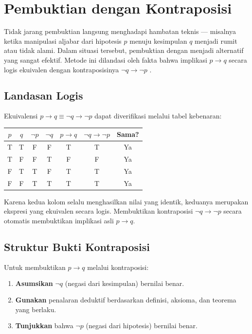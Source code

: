 \section{Pembuktian dengan Kontraposisi}

Tidak jarang pembuktian langsung menghadapi hambatan teknis --- misalnya ketika manipulasi aljabar dari hipotesis $p$ menuju kesimpulan $q$ menjadi rumit atau tidak alami. Dalam situasi tersebut, pembuktian dengan  menjadi alternatif yang sangat efektif. Metode ini dilandasi oleh fakta bahwa implikasi $p \rightarrow q$ secara logis ekuivalen dengan kontraposisinya $\neg q \rightarrow \neg p$ \cite{rosen2019}.

\subsection{Landasan Logis}

Ekuivalensi $p \rightarrow q \equiv \neg q \rightarrow \neg p$ dapat diverifikasi melalui tabel kebenaran:

\begin{center}
\renewcommand{\arraystretch}{1.2}
\begin{tabular}{|c|c||c|c|c|c||c|}
\hline
$p$ & $q$ & $\neg p$ & $\neg q$ & $p \rightarrow q$ & $\neg q \rightarrow \neg p$ & Sama? \\ \hline
T & T & F & F & T & T & Ya \\ \hline
T & F & F & T & F & F & Ya \\ \hline
F & T & T & F & T & T & Ya \\ \hline
F & F & T & T & T & T & Ya \\ \hline
\end{tabular}
\end{center}

Karena kedua kolom selalu menghasilkan nilai yang identik, keduanya merupakan ekspresi yang ekuivalen secara logis. Membuktikan kontraposisi $\neg q \rightarrow \neg p$ secara otomatis membuktikan implikasi asli $p \rightarrow q$.

\subsection{Struktur Bukti Kontraposisi}

Untuk membuktikan $p \rightarrow q$ melalui kontraposisi:

\begin{enumerate}
    \item \textbf{Asumsikan} $\neg q$ (negasi dari kesimpulan) bernilai benar.
    \item \textbf{Gunakan} penalaran deduktif berdasarkan definisi, aksioma, dan teorema yang berlaku.
    \item \textbf{Tunjukkan} bahwa $\neg p$ (negasi dari hipotesis) bernilai benar.
\end{enumerate}

